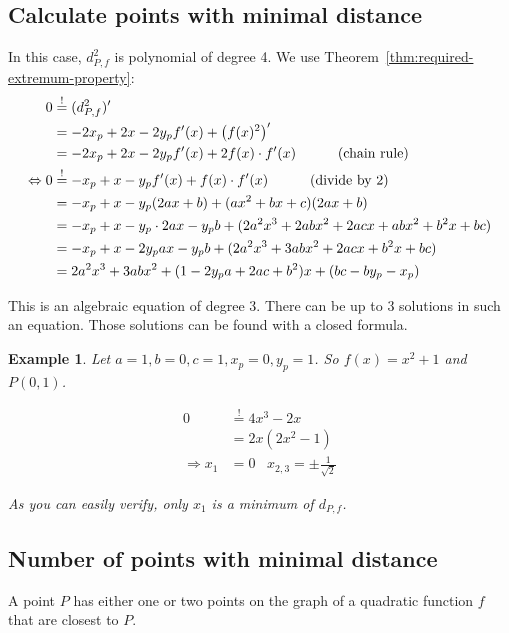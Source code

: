 \documentclass[a4paper]{scrartcl}
\theoremstyle{break}
\newtheorem{example}{Example}
\theoremstyle{nonumberplain}
\begin{document}
\subsection{Calculate points with minimal distance}
In this case, $d_{P,f}^2$ is polynomial of degree 4. 
We use Theorem~\ref{thm:required-extremum-property}:\nobreak
\begin{align}
    0     &\overset{!}{=} (d_{P,f}^2)'\\
          &= -2 x_p + 2x -2y_p f'(x) + \left (f(x)^2 \right )'\\
          &= -2 x_p + 2x -2y_p f'(x) + 2 f(x) \cdot f'(x) \rlap{\hspace*{3em}(chain rule)}\label{eq:minimizingFirstDerivative}\\
\Leftrightarrow 0 &\overset{!}{=} -x_p + x -y_p f'(x) + f(x) \cdot f'(x) \rlap{\hspace*{3em}(divide by 2)}\label{eq:minimizingFirstDerivative}\\
          &= -x_p + x -y_p (2ax+b) + (ax^2+bx+c)(2ax+b)\\
          &= -x_p + x -y_p \cdot 2ax- y_p b + (2 a^2 x^3+2 a b x^2+2 a c x+ab x^2+b^2 x+bc)\\
          &= -x_p + x -2y_p ax- y_p b + (2a^2 x^3 + 3 ab x^2 + 2acx + b^2 x + bc)\\
          &= 2a^2 x^3 + 3 ab x^2 + (1 -2y_p a+ 2ac + b^2)x +(bc-by_p-x_p)\label{eq:quadratic-derivative-eq-0}
\end{align}

This is an algebraic equation of degree 3.
There can be up to 3 solutions in such an equation. Those solutions
can be found with a closed formula.


\begin{example}
    Let $a = 1,  b = 0,  c= 1, x_p= 0, y_p = 1$.
    So $f(x) = x^2 + 1$ and $P(0, 1)$.

\begin{align}
    0 &\stackrel{!}{=} 4 x^3 - 2x\\
      &=2x(2x^2 - 1)\\
    \Rightarrow x_1 &= 0 \;\;\; x_{2,3} = \pm \frac{1}{\sqrt{2}}
\end{align}

As you can easily verify, only $x_1$ is a minimum of $d_{P,f}$.
\end{example}


\subsection{Number of points with minimal distance}
\begin{theorem}
    A point $P$ has either one or two points on the graph of a 
    quadratic function $f$ that are closest to $P$.
\end{theorem}
\end{document}
